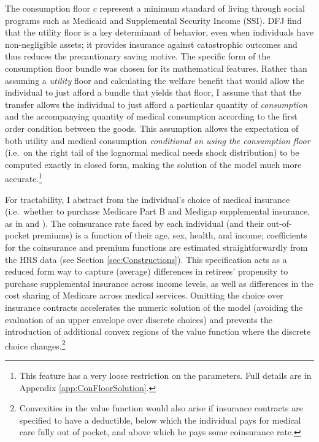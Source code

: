 \documentclass[12pt,pdftex,letterpaper]{article}
\newcommand{\Con}{c}
\newcommand{\ConFloor}{\underbar{\Con}}
\begin{document}
The consumption floor $\ConFloor$ represent a minimum standard of living through social programs such as Medicaid and Supplemental Security Income (SSI).  DFJ find that the utility floor is a key determinant of behavior, even when individuals have non-negligible assets; it provides insurance against catastrophic outcomes and thus reduces the precautionary saving motive.  The specific form of the consumption floor bundle was chosen for its mathematical features.  Rather than assuming a \textit{utility} floor and calculating the welfare benefit that would allow the individual to just afford a bundle that yields that floor, I assume that that the transfer allows the individual to just afford a particular quantity of \textit{consumption} and the accompanying quantity of medical consumption according to the first order condition between the goods.  This assumption allows the expectation of both utility and medical consumption \textit{conditional on using the consumption floor} (i.e.\ on the right tail of the lognormal medical needs shock distribution) to be computed exactly in closed form, making the solution of the model much more accurate.\footnote{This feature has a very loose restriction on the parameters.  Full details are in Appendix \ref{app:ConFloorSolution}.}

For tractability, I abstract from the individual's choice of medical insurance (i.e.\ whether to purchase Medicare Part B and Medigap supplemental insurance, as in \cite{cardon01} and \cite{einav13}).  The coinsurance rate faced by each individual (and their out-of-pocket premiums) is a function of their age, sex, health, and income; coefficients for the coinsurance and premium functions are estimated straightforwardly from the HRS data (see Section \ref{sec:Constructions}).  This specification acts as a reduced form way to capture (average) differences in retirees' propensity to purchase supplemental insurance across income levels, as well as differences in the cost sharing of Medicare across medical services.  Omitting the choice over insurance contracts accelerates the numeric solution of the model (avoiding the evaluation of an upper envelope over discrete choices) and prevents the introduction of additional convex regions of the value function where the discrete choice changes.\footnote{Convexities in the value function would also arise if insurance contracts are specified to have a deductible, below which the individual pays for medical care fully out of pocket, and above which he pays some coinsurance rate.}
\end{document}
